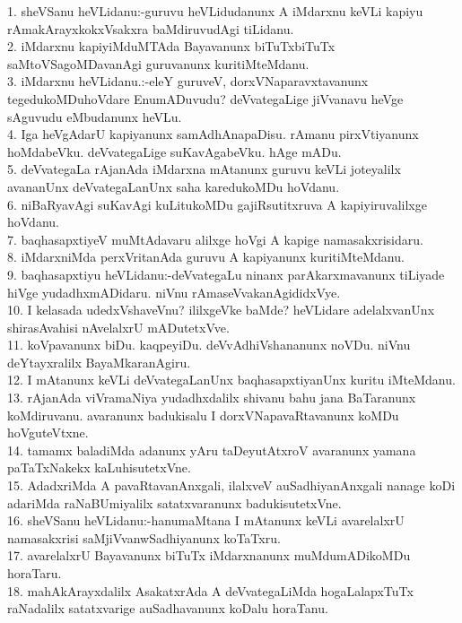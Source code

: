 \documentclass{article}
\begin{document}
1. sheVSanu heVLidanu:-guruvu heVLidudanunx A iMdarxnu keVLi kapiyu rAmakArayxkokxVsakxra baMdiruvudAgi tiLidanu.\\
2. iMdarxnu kapiyiMduMTAda Bayavanunx biTuTxbiTuTx saMtoVSagoMDavanAgi guruvanunx kuritiMteMdanu.\\
3. iMdarxnu heVLidanu.:-eleY guruveV, dorxVNaparavxtavanunx tegedukoMDuhoVdare EnumADuvudu? deVvategaLige jiVvanavu heVge sAguvudu eMbudanunx heVLu.\\
4. Iga heVgAdarU kapiyanunx samAdhAnapaDisu. rAmanu pirxVtiyanunx hoMdabeVku. deVvategaLige suKavAgabeVku. hAge mADu.\\
5. deVvategaLa rAjanAda iMdarxna mAtanunx guruvu keVLi joteyalilx avananUnx deVvategaLanUnx saha karedukoMDu hoVdanu.\\
6. niBaRyavAgi suKavAgi kuLitukoMDu gajiRsutitxruva A kapiyiruvalilxge hoVdanu.\\
7. baqhasapxtiyeV muMtAdavaru alilxge hoVgi A kapige namasakxrisidaru.\\
8. iMdarxniMda perxVritanAda guruvu A kapiyanunx kuritiMteMdanu.\\
9. baqhasapxtiyu heVLidanu:-deVvategaLu ninanx parAkarxmavanunx tiLiyade hiVge yudadhxmADidaru. niVnu rAmaseVvakanAgididxVye.\\
10. I kelasada udedxVshaveVnu? ililxgeVke baMde? heVLidare adelalxvanUnx shirasAvahisi nAvelalxrU mADutetxVve.\\
11. koVpavanunx biDu. kaqpeyiDu. deVvAdhiVshananunx noVDu. niVnu deYtayxralilx BayaMkaranAgiru.\\
12. I mAtanunx keVLi deVvategaLanUnx baqhasapxtiyanUnx kuritu iMteMdanu.\\
13. rAjanAda viVramaNiya yudadhxdalilx shivanu bahu jana BaTaranunx koMdiruvanu. avaranunx badukisalu I dorxVNapavaRtavanunx koMDu hoVguteVtxne.\\
14. tamamx baladiMda adanunx yAru taDeyutAtxroV avaranunx yamana paTaTxNakekx kaLuhisutetxVne.\\
15. AdadxriMda A pavaRtavanAnxgali, ilalxveV auSadhiyanAnxgali nanage koDi adariMda raNaBUmiyalilx satatxvaranunx badukisutetxVne.\\
16. sheVSanu heVLidanu:-hanumaMtana I mAtanunx keVLi avarelalxrU namasakxrisi saMjiVvanwSadhiyanunx koTaTxru.\\
17. avarelalxrU Bayavanunx biTuTx iMdarxnanunx muMdumADikoMDu horaTaru.\\
18. mahAkArayxdalilx AsakatxrAda A deVvategaLiMda hogaLalapxTuTx raNadalilx satatxvarige auSadhavanunx koDalu horaTanu.\\
\end{document}
